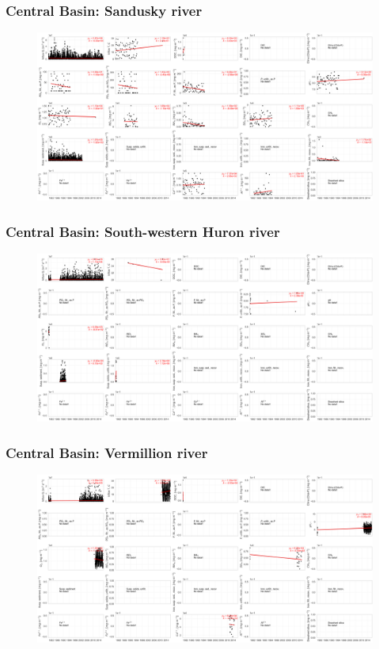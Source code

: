 \documentclass{beamer}
\begin{document}
\begin{frame}
\frametitle{Central Basin: Sandusky river}

\begin{figure}
\includegraphics[width=\textwidth]{rivers/Central basin/sanduskyriver.png}
\end{figure}

\end{frame}

\begin{frame}
\frametitle{Central Basin: South-western Huron river}

\begin{figure}
\includegraphics[width=\textwidth]{rivers/Central basin/southwesternhuronriver.png}
\end{figure}

\end{frame}

\begin{frame}
\frametitle{Central Basin: Vermillion river}

\begin{figure}
\includegraphics[width=\textwidth]{rivers/Central basin/vermillion.png}
\end{figure}

\end{frame}
\end{document}
